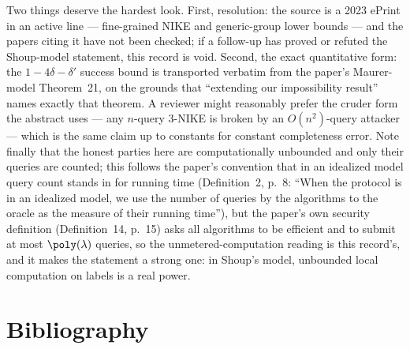 \documentclass{conjura-conjecture}
\begin{document}
\begin{remark}\label{rem:caveats}
Two things deserve the hardest look. First, resolution: the source is a
2023 ePrint in an active line --- fine-grained NIKE and generic-group
lower bounds --- and the papers citing it have not been checked; if a
follow-up has proved or refuted the Shoup-model statement, this record
is void. Second, the exact quantitative form: the
$1 - 4\delta - \delta'$ success bound is transported verbatim from the
paper's Maurer-model Theorem~21, on the grounds that ``extending our
impossibility result'' names exactly that theorem. A reviewer might
reasonably prefer the cruder form the abstract uses --- any $n$-query
3-NIKE is broken by an $O(n^{2})$-query attacker --- which is the same
claim up to constants for constant completeness error. Note finally that
the honest parties here are computationally unbounded and only their
queries are counted; this follows the paper's convention that in an
idealized model query count stands in for running time
(Definition~2, p.~8: ``When the protocol is in an idealized model, we
use the number of queries by the algorithms to the oracle as the measure
of their running time''), but the paper's own security definition
(Definition~14, p.~15) asks all algorithms to be efficient and to submit
at most $\poly(\lambda)$ queries, so the unmetered-computation reading
is this record's, and it makes the statement a strong one: in Shoup's
model, unbounded local computation on labels is a real power.
\end{remark}

\section{Bibliography}
\end{document}
